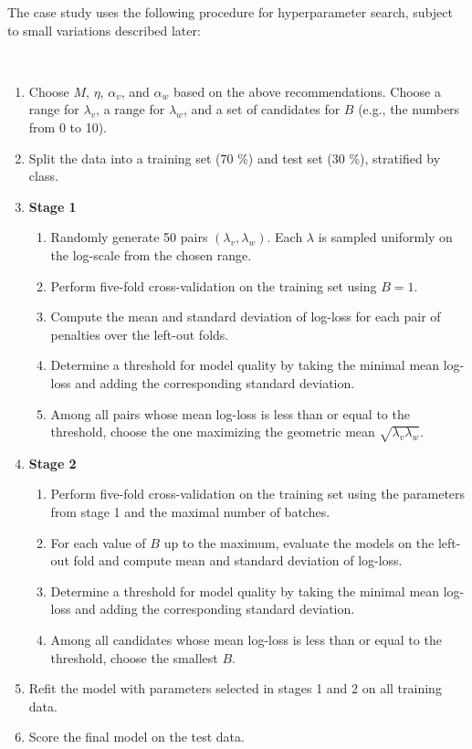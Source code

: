 %
The case study uses the following procedure for hyperparameter search, subject to small variations described later:
%
\begin{algorithm}~
\label{alg_hyperparameters}
%
\begin{enumerate}
\item Choose $M$, $\eta$, $\alpha_v$, and $\alpha_w$ based on the above recommendations.
Choose a range for $\lambda_v$, a range for $\lambda_w$, and a set of candidates for $B$ (e.g., the numbers from 0 to 10).
%
\item Split the data into a training set (70 \%) and test set (30 \%), stratified by class.
%
\item\textbf{Stage 1}
%
\begin{enumerate}
\item Randomly generate 50 pairs $(\lambda_v,\lambda_w)$.
Each $\lambda$ is sampled uniformly on the log-scale from the chosen range.
%
\item Perform five-fold cross-validation on the training set using $B=1$.
%
\item Compute the mean and standard deviation of log-loss for each pair of penalties over the left-out folds.
%
\item Determine a threshold for model quality by taking the minimal mean log-loss and adding the corresponding standard deviation.
%
\item Among all pairs whose mean log-loss is less than or equal to the threshold, choose the one maximizing the geometric mean $\sqrt{\lambda_v\lambda_w}$.
\end{enumerate}
%
\item\textbf{Stage 2}
\begin{enumerate}
\item Perform five-fold cross-validation on the training set using the parameters from stage 1 and the maximal number of batches.
%
\item For each value of $B$ up to the maximum, evaluate the models on the left-out fold and compute mean and standard deviation of log-loss.
%
\item Determine a threshold for model quality by taking the minimal mean log-loss and adding the corresponding standard deviation.
%
\item Among all candidates whose mean log-loss is less than or equal to the threshold, choose the smallest $B$.
\end{enumerate}
%
\item Refit the model with parameters selected in stages 1 and 2 on all training data.
%
\item Score the final model on the test data.
\end{enumerate}
\end{algorithm}
